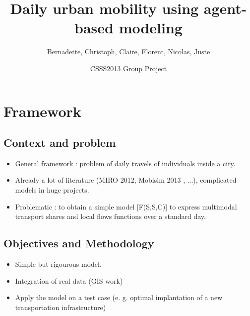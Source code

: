 \documentclass[english]{beamer}
\newcommand\makebeamertitle{\frame{\maketitle}}%
\def\lyxframeend{} %
\begin{document}
\title{Daily urban mobility using agent-based modeling}


\author{Bernadette, Christoph, Claire, Florent, Nicolas, Juste}


\date{CSSS2013 Group Project}

\makebeamertitle

\lyxframeend{}\section{Framework}


\lyxframeend{}\subsection{Context and problem}


\lyxframeend{}
\begin{itemize}
\item General framework : problem of daily travels of individuals inside
a city.


\pause{}

\item Already a lot of literature (MIRO 2012, Mobisim 2013 , ...), complicated
models in huge projects.


\pause{}

\item Problematic : to obtain a simple model {[}F(S,S,C){]} to express multimodal
transport shares and local flows functions over a standard day.
\end{itemize}

\lyxframeend{}\subsection{Objectives and Methodology}


\lyxframeend{}
\begin{itemize}
\item Simple but rigourous model.


\pause{}

\item Integration of real data (GIS work) 


\pause{}

\item Apply the model on a test case (e. g. optimal implantation of a new
transportation infrastructure)
\end{itemize}

\lyxframeend{}
\end{document}

